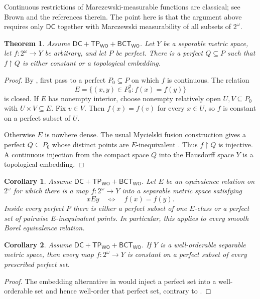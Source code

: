 \documentclass[11pt,reqno]{amsart}
\newcommand{\WO}{\mathsf{WO}}
\newcommand{\restr}{\mathbin{\upharpoonright}}
\newcommand{\BCTWO}{\mathsf{BCT}_{\WO}}
\newcommand{\TP}{\mathsf{TP}_{\WO}}
\theoremstyle{plain}
\newtheorem{theorem}{Theorem}[section]
\newtheorem{corollary}[corollary]{Corollary}
\theoremstyle{definition}
\theoremstyle{remark}
\begin{document}
Continuous restrictions of Marczewski-measurable functions are classical; see Brown \cite{Brown1992} and the references therein.
The point here is that the argument above requires only $\mathsf{DC}$ together with Marczewski measurability of all subsets of $2^\omega$.

\begin{theorem}\label{thm:constant-embedding}
Assume $\mathsf{DC}+\TP+\BCTWO$.  Let $Y$ be a separable metric space,
let $f:2^\omega\to Y$ be arbitrary, and let $P$ be perfect.  There is a
perfect $Q\subseteq P$ such that $f\restr Q$ is either constant or a
topological embedding.
\end{theorem}

\begin{proof}
By , first pass to a perfect
$P_0\subseteq P$ on which $f$ is continuous.  The relation
\[
 E=\{(x,y)\in P_0^2:f(x)=f(y)\}
\]
is closed.  If $E$ has nonempty interior, choose nonempty relatively open
$U,V\subseteq P_0$ with $U\times V\subseteq E$.  Fix $v\in V$.  Then
$f(x)=f(v)$ for every $x\in U$, so $f$ is constant on a perfect subset of
$U$.

Otherwise $E$ is nowhere dense.  The usual Mycielski fusion construction
gives a perfect $Q\subseteq P_0$ whose distinct points are $E$-inequivalent
\cite{Mycielski1964}.  Thus $f\restr Q$ is injective.  A continuous injection
from the compact space $Q$ into the Hausdorff space $Y$ is a topological
embedding.
\end{proof}

\begin{corollary}\label{cor:kernel-dichotomy}
Assume $\mathsf{DC}+\TP+\BCTWO$.  Let $E$ be an equivalence relation on
$2^\omega$ for which there is a map $f:2^\omega\to Y$ into a separable
metric space satisfying
\[
 xEy\quad\Longleftrightarrow\quad f(x)=f(y).
\]
Inside every perfect $P$ there is either a perfect subset of one $E$-class or
a perfect set of pairwise $E$-inequivalent points.  In particular, this
applies to every smooth Borel equivalence relation.
\end{corollary}

\begin{corollary}\label{cor:wo-codomain}
Assume $\mathsf{DC}+\TP+\BCTWO$.  If $Y$ is a well-orderable separable
metric space, then every map $f:2^\omega\to Y$ is constant on a perfect
subset of every prescribed perfect set.
\end{corollary}

\begin{proof}
The embedding alternative in  would inject a
perfect set into a well-orderable set and hence well-order that perfect set,
contrary to .
\end{proof}
\end{document}
